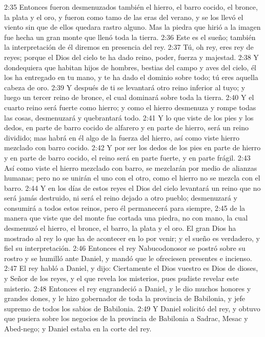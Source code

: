 2:35 Entonces fueron desmenuzados también el hierro, el barro cocido, el bronce, la plata y el oro, y fueron como tamo de las eras del verano, y se los llevó el viento sin que de ellos quedara rastro alguno. Mas la piedra que hirió a la imagen fue hecha un gran monte que llenó toda la tierra.  
2:36 Este es el sueño; también la interpretación de él diremos en presencia del rey.  
2:37 Tú, oh rey, eres rey de reyes; porque el Dios del cielo te ha dado reino, poder, fuerza y majestad.  
2:38 Y dondequiera que habitan hijos de hombres, bestias del campo y aves del cielo, él los ha entregado en tu mano, y te ha dado el dominio sobre todo; tú eres aquella cabeza de oro.  
2:39 Y después de ti se levantará otro reino inferior al tuyo; y luego un tercer reino de bronce, el cual dominará sobre toda la tierra.  
2:40 Y el cuarto reino será fuerte como hierro; y como el hierro desmenuza y rompe todas las cosas, desmenuzará y quebrantará todo.  
2:41 Y lo que viste de los pies y los dedos, en parte de barro cocido de alfarero y en parte de hierro, será un reino dividido; mas habrá en él algo de la fuerza del hierro, así como viste hierro mezclado con barro cocido.  
2:42 Y por ser los dedos de los pies en parte de hierro y en parte de barro cocido, el reino será en parte fuerte, y en parte frágil.  
2:43 Así como viste el hierro mezclado con barro, se mezclarán por medio de alianzas humanas; pero no se unirán el uno con el otro, como el hierro no se mezcla con el barro.  
2:44 Y en los días de estos reyes el Dios del cielo levantará un reino que no será jamás destruido, ni será el reino dejado a otro pueblo; desmenuzará y consumirá a todos estos reinos, pero él permanecerá para siempre,  
2:45 de la manera que viste que del monte fue cortada una piedra, no con mano, la cual desmenuzó el hierro, el bronce, el barro, la plata y el oro. El gran Dios ha mostrado al rey lo que ha de acontecer en lo por venir; y el sueño es verdadero, y fiel su interpretación.  
2:46 Entonces el rey Nabucodonosor se postró sobre su rostro y se humilló ante Daniel, y mandó que le ofreciesen presentes e incienso.  
2:47 El rey habló a Daniel, y dijo: Ciertamente el Dios vuestro es Dios de dioses, y Señor de los reyes, y el que revela los misterios, pues pudiste revelar este misterio.  
2:48 Entonces el rey engrandeció a Daniel, y le dio muchos honores y grandes dones, y le hizo gobernador de toda la provincia de Babilonia, y jefe supremo de todos los sabios de Babilonia.  
2:49 Y Daniel solicitó del rey, y obtuvo que pusiera sobre los negocios de la provincia de Babilonia a Sadrac, Mesac y Abed-nego; y Daniel estaba en la corte del rey.  

